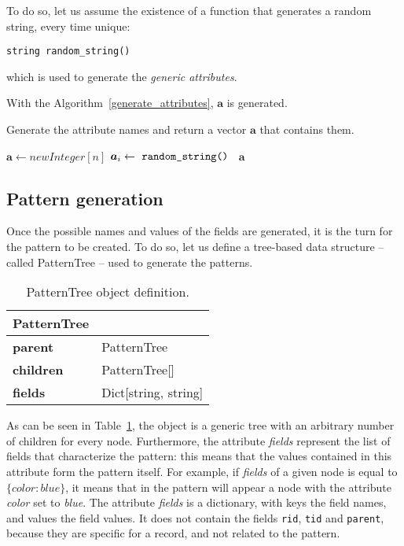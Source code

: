 \documentclass{acm_proc_article-sp-sigmod09}
\begin{document}
To do so, let us assume the existence of a function that generates a random string, every time unique:
\begin{verbatim}
string random_string()
\end{verbatim}
which is used to generate the \emph{generic attributes}.

With the Algorithm~\ref{generate_attributes}, $\boldsymbol{a}$ is generated.
\begin{algorithm}
\caption{Generate the attribute names and return a vector $\boldsymbol{a}$ that contains them.}
\label{generate_attributes}
\begin{algorithmic}[1]
\State $\boldsymbol{a} \gets new Integer[n]$
	\State $\boldsymbol{a}_i \gets \text{ \texttt{random\_string() }} $ 
\EndFor
\Return $\boldsymbol{a}$
\EndFunction
\end{algorithmic}
\end{algorithm}

\subsection{Pattern generation}
Once the possible names and values of the fields are generated, it is the turn for the pattern to be created. To do so, let us define a tree-based data structure -- called PatternTree -- used to generate the patterns.

\begin{table}[H]
\centering
\begin{tabular}{|ll|} \hline
\textbf{PatternTree} & \\ \hline
\textbf{parent} & PatternTree \\ \hline
\textbf{children} & PatternTree[] \\ \hline
\textbf{fields} & Dict[string, string] \\
\hline\end{tabular}
\caption{PatternTree object definition.}
\label{tab:patterntree}
\end{table}

As can be seen in Table~\ref{tab:patterntree}, the object is a generic tree with an arbitrary number of children for every node. Furthermore, the attribute \emph{fields} represent the list of fields that characterize the pattern: this means that the values contained in this attribute form the pattern itself. For example, if \emph{fields} of a given node is equal to $ \{ color : blue \} $, it means that in the pattern will appear a node with the attribute \emph{color} set to \emph{blue}. The attribute \emph{fields} is a dictionary, with keys the field names, and values the field values. It does not contain the fields \texttt{rid}, \texttt{tid} and \texttt{parent}, because they are specific for a record, and not related to the pattern.
\end{document}
